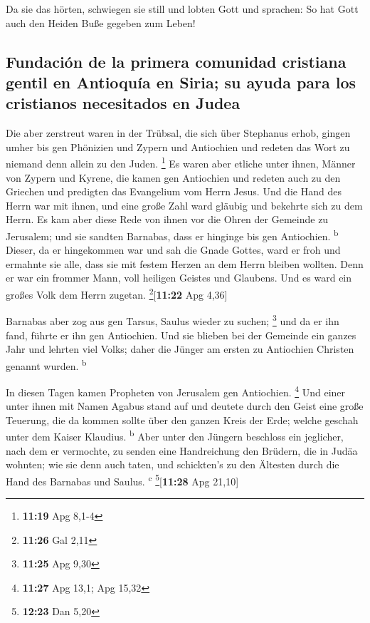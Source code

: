  Da sie das hörten, schwiegen sie still und lobten Gott
und sprachen: So hat Gott auch den Heiden Buße gegeben zum Leben!

\hypertarget{fundaciuxf3n-de-la-primera-comunidad-cristiana-gentil-en-antioquuxeda-en-siria-su-ayuda-para-los-cristianos-necesitados-en-judea}{%
\subsection{Fundación de la primera comunidad cristiana gentil en
Antioquía en Siria; su ayuda para los cristianos necesitados en
Judea}\label{fundaciuxf3n-de-la-primera-comunidad-cristiana-gentil-en-antioquuxeda-en-siria-su-ayuda-para-los-cristianos-necesitados-en-judea}}

 Die aber zerstreut waren in der Trübsal, die sich über
Stephanus erhob, gingen umher bis gen Phönizien und Zypern und
Antiochien und redeten das Wort zu niemand denn allein zu den Juden.
\footnote{\textbf{11:19} Apg 8,1-4}  Es waren aber
etliche unter ihnen, Männer von Zypern und Kyrene, die kamen gen
Antiochien und redeten auch zu den Griechen und predigten das Evangelium
vom Herrn Jesus.  Und die Hand des Herrn war mit ihnen,
und eine große Zahl ward gläubig und bekehrte sich zu dem Herrn.
 Es kam aber diese Rede von ihnen vor die Ohren der
Gemeinde zu Jerusalem; und sie sandten Barnabas, dass er hinginge bis
gen Antiochien. \textsuperscript{b}  Dieser, da er
hingekommen war und sah die Gnade Gottes, ward er froh und ermahnte sie
alle, dass sie mit festem Herzen an dem Herrn bleiben wollten.
 Denn er war ein frommer Mann, voll heiligen Geistes und
Glaubens. Und es ward ein großes Volk dem Herrn zugetan.
\footnote{\textbf{11:26} Gal 2,11}{[}\textbf{11:22} Apg 4,36{]}

 Barnabas aber zog aus gen Tarsus, Saulus wieder zu
suchen; \footnote{\textbf{11:25} Apg 9,30}  und da er ihn
fand, führte er ihn gen Antiochien. Und sie blieben bei der Gemeinde ein
ganzes Jahr und lehrten viel Volks; daher die Jünger am ersten zu
Antiochien Christen genannt wurden. \textsuperscript{b}

 In diesen Tagen kamen Propheten von Jerusalem gen
Antiochien. \footnote{\textbf{11:27} Apg 13,1; Apg 15,32}
 Und einer unter ihnen mit Namen Agabus stand auf und
deutete durch den Geist eine große Teuerung, die da kommen sollte über
den ganzen Kreis der Erde; welche geschah unter dem Kaiser Klaudius.
\textsuperscript{b}  Aber unter den Jüngern beschloss ein
jeglicher, nach dem er vermochte, zu senden eine Handreichung den
Brüdern, die in Judäa wohnten;  wie sie denn auch taten,
und schickten's zu den Ältesten durch die Hand des Barnabas und Saulus.
\textsuperscript{c} \footnote{\textbf{12:23} Dan 5,20}{[}\textbf{11:28}
Apg 21,10{]}

